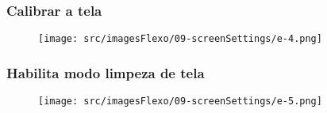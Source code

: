 \newpage
\thispagestyle{fancy}
\vspace*{40 pt}
\subsubsection{\small{Calibrar a tela}}
\vspace*{\fill}
\begin{figure}[h]
  \centering
  \texttt{[image: src/imagesFlexo/09-screenSettings/e-4.png]}
\end{figure}
\vspace*{\fill}

\newpage
\thispagestyle{fancy}
\vspace*{40 pt}
\subsubsection{\small{Habilita modo limpeza de tela}}
\vspace*{\fill}
\begin{figure}[h]
  \centering
  \texttt{[image: src/imagesFlexo/09-screenSettings/e-5.png]}
\end{figure}
\vspace*{\fill}